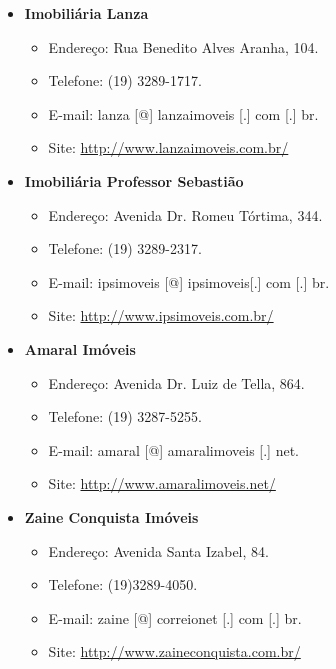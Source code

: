 \begin{itemize}
\item  \textbf{Imobiliária Lanza}
\begin{itemize}
\item  Endereço: Rua Benedito Alves Aranha, 104.
\item  Telefone: (19) 3289-1717.
\item  E-mail: lanza [@] lanzaimoveis [.] com [.] br.
\item  Site: \url{http://www.lanzaimoveis.com.br/}
\end{itemize}
\end{itemize}

\begin{itemize}
\item  \textbf{Imobiliária Professor Sebastião}
\begin{itemize}
\item  Endereço: Avenida Dr. Romeu Tórtima, 344.
\item  Telefone: (19) 3289-2317.
\item  E-mail: ipsimoveis [@] ipsimoveis[.] com [.] br.
\item  Site: \url{http://www.ipsimoveis.com.br/}
\end{itemize}
\end{itemize}

\begin{itemize}
\item  \textbf{Amaral Imóveis}
\begin{itemize}
\item  Endereço: Avenida Dr. Luiz de Tella, 864.
\item  Telefone: (19) 3287-5255.
\item  E-mail: amaral [@] amaralimoveis [.] net.
\item  Site: \url{http://www.amaralimoveis.net/}
\end{itemize}
\end{itemize}

\begin{itemize}
\item  \textbf{Zaine Conquista Imóveis}
\begin{itemize}
\item  Endereço: Avenida Santa Izabel, 84.
\item  Telefone: (19)3289-4050.
\item  E-mail: zaine [@] correionet [.] com [.] br.
\item  Site: \url{http://www.zaineconquista.com.br/}
\end{itemize}
\end{itemize}

